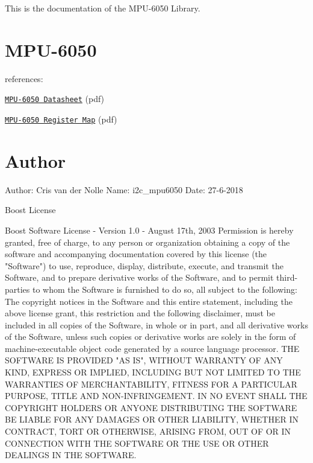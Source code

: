 This is the documentation of the M\+P\+U-\/6050 Library. \hypertarget{index_MPU-6050}{}\section{M\+P\+U-\/6050}\label{index_MPU-6050}
 references\+:
\begin{DoxyItemize}
\item \href{https://www.invensense.com/wp-content/uploads/2015/02/MPU-6000-Datasheet1.pdf}{\tt M\+P\+U-\/6050 Datasheet} (pdf)
\item \href{https://www.invensense.com/wp-content/uploads/2015/02/MPU-6000-Register-Map1.pdf}{\tt M\+P\+U-\/6050 Register Map} (pdf) 
\end{DoxyItemize}\hypertarget{index_Boost}{}\section{Author}\label{index_Boost}
\begin{DoxyVerb}Author: Cris van der Nolle
Name: i2c_mpu6050
Date: 27-6-2018
\end{DoxyVerb}
  Boost License \begin{DoxyVerb}Boost Software License - Version 1.0 - August 17th, 2003
Permission is hereby granted, free of charge, to any person or organization
obtaining a copy of the software and accompanying documentation covered by
this license (the "Software") to use, reproduce, display, distribute,
execute, and transmit the Software, and to prepare derivative works of the
Software, and to permit third-parties to whom the Software is furnished to
do so, all subject to the following:
The copyright notices in the Software and this entire statement, including
the above license grant, this restriction and the following disclaimer,
must be included in all copies of the Software, in whole or in part, and
all derivative works of the Software, unless such copies or derivative
works are solely in the form of machine-executable object code generated by
a source language processor.
THE SOFTWARE IS PROVIDED "AS IS", WITHOUT WARRANTY OF ANY KIND, EXPRESS OR
IMPLIED, INCLUDING BUT NOT LIMITED TO THE WARRANTIES OF MERCHANTABILITY,
FITNESS FOR A PARTICULAR PURPOSE, TITLE AND NON-INFRINGEMENT. IN NO EVENT
SHALL THE COPYRIGHT HOLDERS OR ANYONE DISTRIBUTING THE SOFTWARE BE LIABLE
FOR ANY DAMAGES OR OTHER LIABILITY, WHETHER IN CONTRACT, TORT OR OTHERWISE,
ARISING FROM, OUT OF OR IN CONNECTION WITH THE SOFTWARE OR THE USE OR OTHER
DEALINGS IN THE SOFTWARE.  \end{DoxyVerb}
 